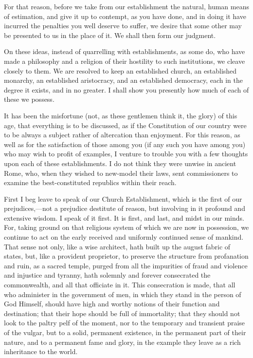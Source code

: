For that reason, before we take from our establishment the natural, human means of estimation, and give it up to contempt, as you have done, and in doing it have incurred the penalties you well deserve to suffer, we desire that some other may be presented to us in the place of it. We shall then form our judgment.

On these ideas, instead of quarrelling with establishments, as some do, who have made a philosophy and a religion of their hostility to such institutions, we cleave closely to them. We are resolved to keep an established church, an established monarchy, an established aristocracy, and an established democracy, each in the degree it exists, and in no greater. I shall show you presently how much of each of these we possess.

It has been the misfortune (not, as these gentlemen think it, the glory) of this age, that everything is to be discussed, as if the Constitution of our country were to be always a subject rather of altercation than enjoyment. For this reason, as well as for the satisfaction of those among you (if any such you have among you) who may wish to profit of examples, I venture to trouble you with a few thoughts upon each of these establishments. I do not think they were unwise in ancient Rome, who, when they wished to new-model their laws, sent commissioners to examine the best-constituted republics within their reach.

First I beg leave to speak of our Church Establishment, which is the first of our prejudices,—not a prejudice destitute of reason, but involving in it profound and extensive wisdom. I speak of it first. It is first, and last, and midst in our minds. For, taking ground on that religious system of which we are now in possession, we continue to act on the early received and uniformly continued sense of mankind. That sense not only, like a wise architect, hath built up the august fabric of states, but, like a provident proprietor, to preserve the structure from profanation and ruin, as a sacred temple, purged from all the impurities of fraud and violence and injustice and tyranny, hath solemnly and forever consecrated the commonwealth, and all that officiate in it. This consecration is made, that all who administer in the government of men, in which they stand in the person of God Himself, should have high and worthy notions of their function and destination; that their hope should be full of immortality; that they should not look to the paltry pelf of the moment, nor to the temporary and transient praise of the vulgar, but to a solid, permanent existence, in the permanent part of their nature, and to a permanent fame and glory, in the example they leave as a rich inheritance to the world.

